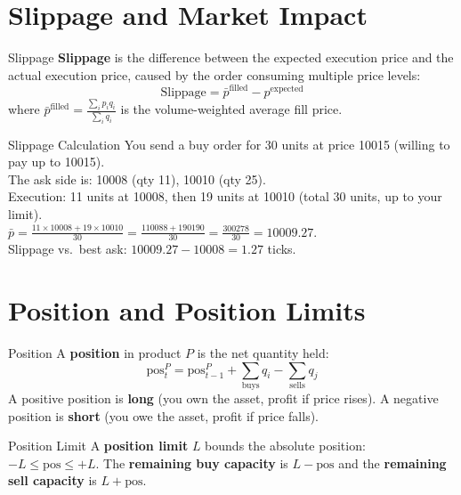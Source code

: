 \documentclass[12pt,a4paper,openany]{report}
\theoremstyle{definition}
\begin{document}
\section{Slippage and Market Impact}

\begin{definitionbox}{Slippage}
\textbf{Slippage} is the difference between the expected execution price and the actual execution price, caused by the order consuming multiple price levels:
\[
  \text{Slippage} = \bar{p}^{\text{filled}} - p^{\text{expected}}
\]
where $\bar{p}^{\text{filled}} = \frac{\sum_i p_i q_i}{\sum_i q_i}$ is the volume-weighted average fill price.
\end{definitionbox}

\begin{examplebox}{Slippage Calculation}
You send a buy order for 30 units at price 10015 (willing to pay up to 10015). \\
The ask side is: 10008 (qty 11), 10010 (qty 25). \\
Execution: 11 units at 10008, then 19 units at 10010 (total 30 units, up to your limit). \\
$\bar{p} = \frac{11 \times 10008 + 19 \times 10010}{30} = \frac{110088 + 190190}{30} = \frac{300278}{30} = 10009.27$. \\
Slippage vs.\ best ask: $10009.27 - 10008 = 1.27$ ticks.
\end{examplebox}

\section{Position and Position Limits}

\begin{definitionbox}{Position}
A \textbf{position} in product $P$ is the net quantity held:
\[
  \text{pos}_t^P = \text{pos}_{t-1}^P + \sum_{\text{buys}} q_i - \sum_{\text{sells}} q_j
\]
A positive position is \textbf{long} (you own the asset, profit if price rises). A negative position is \textbf{short} (you owe the asset, profit if price falls).
\end{definitionbox}

\begin{definitionbox}{Position Limit}
A \textbf{position limit} $L$ bounds the absolute position: $-L \leq \text{pos} \leq +L$. The \textbf{remaining buy capacity} is $L - \text{pos}$ and the \textbf{remaining sell capacity} is $L + \text{pos}$.
\end{definitionbox}
\end{document}
